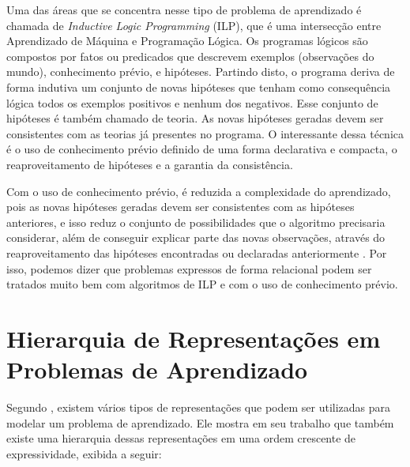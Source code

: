 Uma das áreas que se concentra nesse tipo de problema de aprendizado é chamada de \textit{Inductive Logic Programming} (ILP), que é uma intersecção entre Aprendizado de Máquina e Programação Lógica. Os programas lógicos são compostos por fatos ou predicados que descrevem exemplos (observações do mundo), conhecimento prévio, e hipóteses. Partindo disto, o programa deriva de forma indutiva um conjunto de novas hipóteses que tenham como consequência lógica todos os exemplos positivos e nenhum dos negativos. Esse conjunto de hipóteses é também chamado de teoria. As novas hipóteses geradas devem ser consistentes com as teorias já presentes no programa. O interessante dessa técnica é o uso de conhecimento prévio definido de uma forma declarativa e compacta, o reaproveitamento de hipóteses e a garantia da consistência.

Com o uso de conhecimento prévio, é reduzida a complexidade do aprendizado, pois as novas hipóteses geradas devem ser consistentes com as hipóteses anteriores, e isso reduz o conjunto de possibilidades que o algoritmo precisaria considerar, além de conseguir explicar parte das novas observações, através do reaproveitamento das hipóteses encontradas ou declaradas anteriormente \citep[capítulo 19]{AIMA}. Por isso, podemos dizer que problemas expressos de forma relacional podem ser tratados muito bem com algoritmos de ILP e com o uso de conhecimento prévio.

\section{Hierarquia de Representações em Problemas de Aprendizado}
\label{sec:fundamentos}

Segundo \citet{Raedt2008}, existem vários tipos de representações que podem ser utilizadas para modelar um problema de aprendizado. Ele mostra em seu trabalho que também existe uma hierarquia dessas representações em uma ordem crescente de expressividade, exibida a seguir:


